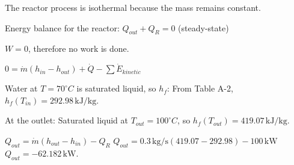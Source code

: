 The reactor process is isothermal because the mass remains constant.  

Energy balance for the reactor:  
\( Q_{out} + Q_R = 0 \) (steady-state)  

\( W = 0 \), therefore no work is done.  

\( 0 = \dot{m} (h_{in} - h_{out}) + \dot{Q} - \sum \dot{E}_{kinetic} \)  

Water at \( T = 70^\circ C \) is saturated liquid, so \( h_f \):  
From Table A-2, \( h_f(T_{in}) = 292.98 \, \text{kJ/kg} \).  

At the outlet:  
Saturated liquid at \( T_{out} = 100^\circ C \), so \( h_f(T_{out}) = 419.07 \, \text{kJ/kg} \).  

\( Q_{out} = \dot{m} (h_{out} - h_{in}) - Q_R \)  
\( Q_{out} = 0.3 \, \text{kg/s} (419.07 - 292.98) - 100 \, \text{kW} \)  
\( Q_{out} = -62.182 \, \text{kW} \).